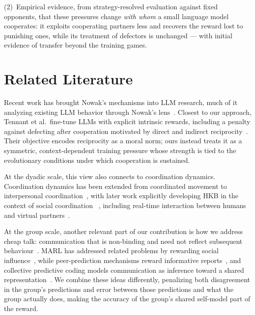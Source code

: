 \documentclass{article}
\begin{document}
(2)~Empirical evidence, from strategy-resolved evaluation against fixed
opponents, that these pressures change \emph{with whom} a small language model
cooperates: it exploits cooperating partners less and recovers the reward lost
to punishing ones, while its treatment of defectors is unchanged --- with
initial evidence of transfer beyond the training games.

\section{Related Literature}

Recent work has brought Nowak's mechanisms into LLM research, much of it
analyzing existing LLM behavior through Nowak's lens~\citep{ren2025,zhu2026}.
Closest to our approach, Tennant et al.\ fine-tune LLMs with explicit intrinsic
rewards, including a penalty against defecting after cooperation motivated by
direct and indirect reciprocity~\citep{tennant2025}. Their objective encodes
reciprocity as a moral norm; ours instead treats it as a symmetric,
context-dependent training pressure whose strength is tied to the evolutionary
conditions under which cooperation is sustained.

At the dyadic scale, this view also connects to coordination dynamics.
Coordination dynamics has been extended from coordinated movement to
interpersonal coordination~\citep{schmidt2008dynamics}, with later work
explicitly developing HKB in the context of social coordination
~\citep{tognoli2020}, including real-time interaction between humans and
virtual partners~\citep{dumas2014human}.

At the group scale, another relevant part of our contribution is how we address
cheap talk: communication that is non-binding and need not reflect subsequent
behaviour~\citep{crawford1982,farrell1996}. MARL has addressed related
problems by rewarding social influence~\citep{jaques2019social}, while
peer-prediction mechanisms reward informative reports~\citep{prelec2004bayesian},
and collective predictive coding models communication as inference toward a
shared representation~\citep{taniguchi2024collective,taniguchi2026symbiotic}.
We combine these ideas differently, penalizing both disagreement in the
group's predictions and error between those predictions and what the group
actually does, making the accuracy of the group's shared self-model part of
the reward.


\end{document}
